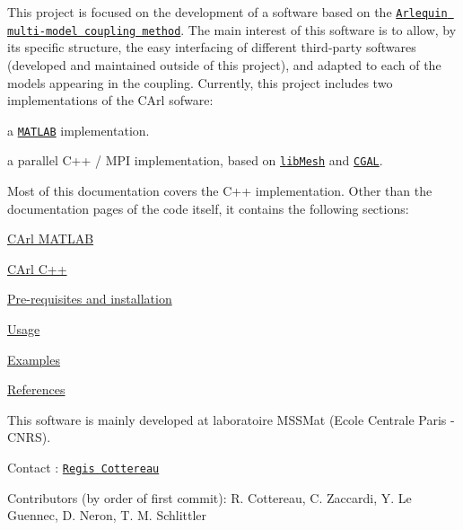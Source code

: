 This project is focused on the development of a software based on the \href{https://www.sciencedirect.com/science/article/pii/S0045782508003630}{\tt Arlequin multi-\/model coupling method}. The main interest of this software is to allow, by its specific structure, the easy interfacing of different third-\/party softwares (developed and maintained outside of this project), and adapted to each of the models appearing in the coupling. Currently, this project includes two implementations of the C\+Arl sofware\+:


\begin{DoxyEnumerate}
\item a \href{http://www.mathworks.fr/products/matlab/}{\tt M\+A\+T\+L\+A\+B} implementation.
\item a parallel C++ / M\+P\+I implementation, based on \href{https://libmesh.github.io}{\tt lib\+Mesh} and \href{http://www.cgal.org}{\tt C\+G\+A\+L}.
\end{DoxyEnumerate}

Most of this documentation covers the C++ implementation. Other than the documentation pages of the code itself, it contains the following sections\+:


\begin{DoxyItemize}
\item \hyperlink{matlab_main}{C\+Arl M\+A\+T\+L\+A\+B}
\item \hyperlink{cpp_main}{C\+Arl C++}
\begin{DoxyItemize}
\item \hyperlink{cpp_installation}{Pre-\/requisites and installation}
\item \hyperlink{cpp_usage}{Usage}
\item \hyperlink{cpp_examples}{Examples}
\end{DoxyItemize}
\item \hyperlink{articles}{References}
\end{DoxyItemize}

This software is mainly developed at laboratoire M\+S\+S\+Mat (Ecole Centrale Paris -\/ C\+N\+R\+S).


\begin{DoxyItemize}
\item Contact \+: \href{mailto:regis.cottereau@ecp.fr}{\tt Regis Cottereau}
\item Contributors (by order of first commit)\+: R. Cottereau, C. Zaccardi, Y. Le Guennec, D. Neron, T. M. Schlittler 
\end{DoxyItemize}